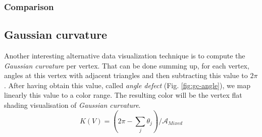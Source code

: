 \subsubsection{Comparison}
\color{red}{TODO: add armadillo, horse, etc. images with these 3 effects (flat shading 1 and 2, gouraud shading)}
\color{black} %

\subsection{Gaussian curvature}
\label{section:vertex-area-gaussian-curvature}
Another interesting alternative data visualization technique is to compute the \textit{Gaussian curvature} per vertex. That can be done summing up, for each vertex, angles at this vertex with adjacent triangles and then subtracting this value to $2\pi$.
After having obtain this value, called \textit{angle defect} (Fig. \ref{fig:gc-angle}), we map linearly this value to a color range.
The resulting color will be the vertex flat shading visualisation of \textit{Gaussian curvature}.
$$K(V) = (2\pi - \sum_j \theta_j)/\mathcal{A}_{Mixed}$$
